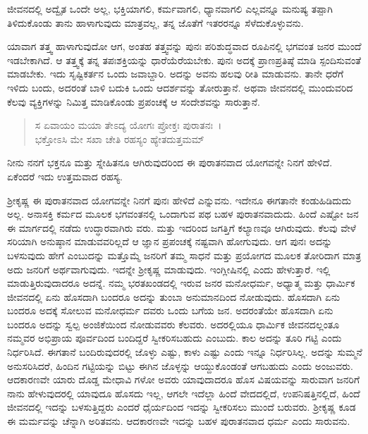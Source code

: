 ಜೀವನದಲ್ಲಿ ಅದ್ವೈತ ಒಂದೇ ಅಲ್ಲ, ಭಕ್ತಿಯಾಗಲಿ, ಕರ್ಮವಾಗಲಿ, ಧ್ಯಾನವಾಗಲಿ ಎಲ್ಲವನ್ನೂ ಮನುಷ್ಯ ತಪ್ಪಾಗಿ ತಿಳಿದುಕೊಂಡು ತಾನು ಹಾಳಾಗುವುದು ಮಾತ್ರವಲ್ಲ, ತನ್ನ ಜೊತೆಗೆ ಇತರರನ್ನೂ ಸೆಳೆದುಕೊಳ್ಳುವನು.

ಯಾವಾಗ ತತ್ತ್ವ ಹಾಳಾಗುವುದೋ ಆಗ, ಅಂತಹ ತತ್ತ್ವವನ್ನು ಪುನಃ ಪರಿಶುದ್ಧವಾದ ರೂಪಿನಲ್ಲಿ ಭಗವಂತ ಜನರ ಮುಂದೆ ಇಡಬೇಕಾಗಿದೆ. ಆ ತತ್ತ್ವಕ್ಕೆ ತನ್ನ ತಪಃಶಕ್ತಿಯನ್ನು ಧಾರೆಯೆರೆಯಬೇಕು. ಪುನಃ ಅದಕ್ಕೆ ಪ್ರಾಣಪ್ರತಿಷ್ಠೆ ಮಾಡಿ ಸ್ಪಂದಿಸುವಂತೆ ಮಾಡಬೇಕು. ಇದು ಸೃಷ್ಟಿಕರ್ತನ ಒಂದು ಜವಾಬ್ದಾರಿ. ಅದನ್ನು ಅವನು ಹಲವು ರೀತಿ ಮಾಡುವನು. ತಾನೇ ಧರೆಗೆ ಇಳಿದು ಬಂದು, ಅದರಂತೆ ಬಾಳಿ ಬದುಕಿ ಒಂದು ಆದರ್ಶವನ್ನು ತೋರುತ್ತಾನೆ. ಅಥವಾ ಜೀವನದಲ್ಲಿ ಮುಂದುವರಿದ ಕೆಲವು ವ್ಯಕ್ತಿಗಳನ್ನು ನಿಮಿತ್ತ ಮಾಡಿಕೊಂಡು ಪ್ರಪಂಚಕ್ಕೆ ಆ ಸಂದೇಶವನ್ನು ಸಾರುತ್ತಾನೆ.

\begin{verse}
ಸ ಏವಾಯಂ ಮಯಾ ತೇಽದ್ಯ ಯೋಗಃ ಪ್ರೋಕ್ತಃ ಪುರಾತನಃ~।\\ಭಕ್ತೋಽಸಿ ಮೇ ಸಖಾ ಚೇತಿ ರಹಸ್ಯಂ ಹ್ಯೇತದುತ್ತಮಮ್ 
\end{verse}

{\small ನೀನು ನನಗೆ ಭಕ್ತನೂ ಮತ್ತು ಸ್ನೇಹಿತನೂ ಆಗಿರುವುದರಿಂದ ಈ ಪುರಾತನವಾದ ಯೋಗವನ್ನೇ ನಿನಗೆ ಹೇಳಿದೆ. ಏಕೆಂದರೆ ಇದು ಉತ್ತಮವಾದ ರಹಸ್ಯ.}

ಶ‍್ರೀಕೃಷ್ಣ ಈ ಪುರಾತನವಾದ ಯೋಗವನ್ನೇ ನಿನಗೆ ಪುನಃ ಹೇಳಿದೆ ಎನ್ನುವನು. ಇದೇನೂ ಈಗತಾನೇ ಕಂಡುಹಿಡಿದುದು ಅಲ್ಲ. ಅನಾಸಕ್ತಿ ಕರ್ಮದ ಮೂಲಕ ಭಗವಂತನಲ್ಲಿ ಒಂದಾಗುವ ಪಥ ಬಹಳ ಪುರಾತನವಾದುದು. ಹಿಂದೆ ಎಷ್ಟೋ ಜನ ಈ ಮಾರ್ಗದಲ್ಲಿ ನಡೆದು ಉದ್ಧಾರವಾಗಿರು ವರು. ಮತ್ತು ಇದರಿಂದ ಜಗತ್ತಿಗೆ ಕಲ್ಯಾಣವೂ ಆಗಿರುವುದು. ಕೆಲವು ವೇಳೆ ಸರಿಯಾಗಿ ಅನುಷ್ಠಾನ ಮಾಡುವವರಿಲ್ಲದೆ ಆ ಜ್ಞಾನ ಪ್ರಪಂಚಕ್ಕೆ ನಷ್ಟವಾಗಿ ಹೋಗುವುದು. ಆಗ ಪುನಃ ಅದನ್ನು ಬಳಸುವುದು ಹೇಗೆ ಎಂಬುದನ್ನು ಮತ್ತೊಮ್ಮೆ ಜನರಿಗೆ ತಮ್ಮ ಸಾಧನೆ ಮತ್ತು ಪ್ರಯೋಗದ ಮೂಲಕ ತೋರಿದಾಗ ಮಾತ್ರ ಅದು ಜನರಿಗೆ ಅರ್ಥವಾಗುವುದು. ಇದನ್ನೇ ಶ‍್ರೀಕೃಷ್ಣ ಮಾಡುವುದು. ಇಂಗ್ಲೀಷಿನಲ್ಲಿ  ಎಂದು ಹೇಳುತ್ತಾರೆ. ಇಲ್ಲಿ ಮಾಡುತ್ತಿರುವುದಾದರೂ ಅದನ್ನೆ. ನಮ್ಮ ಭರತಖಂಡದಲ್ಲಿ ಇರುವ ಜನರ ಮನೋಧರ್ಮ, ಅಧ್ಯಾತ್ಮ ಮತ್ತು ಧಾರ್ಮಿಕ ಜೀವನದಲ್ಲಿ ಏನು ಹೊಸದಾಗಿ ಬಂದರೂ ಅದನ್ನು ತುಂಬಾ ಅನುಮಾನದಿಂದ ನೋಡುವುದು. ಹೊಸದಾಗಿ ಏನು ಬಂದರೂ ಅದಕ್ಕೆ ಸೋಲುವ ಮನೋಧರ್ಮ ದವರು ಒಂದು ಬಗೆಯ ಜನ. ಅದರಂತೆಯೇ ಹೊಸದಾಗಿ ಏನು ಬಂದರೂ ಅದನ್ನು ಸ್ವಲ್ಪ ಅಂಜಿಕೆಯಿಂದ ನೋಡುವವರು ಕೆಲವರು. ಅದರಲ್ಲಿಯೂ ಧಾರ್ಮಿಕ ಜೀವನದಲ್ಲಂತೂ ನಮ್ಮವರ ಅಭಿಪ್ರಾಯ ಪೂರ್ವದಿಂದ ಬಂದಿದ್ದರೆ ಸ್ವೀಕರಿಸಬಹುದು ಎಂಬುದು. ಕಾಲ ಅದನ್ನು ತೂರಿ ಗಟ್ಟಿ ಎಂದು ನಿರ್ಧರಿಸಿದೆ. ಈಗತಾನೆ ಬಂದಿರುವುದರಲ್ಲಿ ಜೊಳ್ಳು ಎಷ್ಟು, ಕಾಳು ಎಷ್ಟು ಎಂದು ಇನ್ನೂ ನಿರ್ಧರಿಸಿಲ್ಲ. ಅದನ್ನು ಸುಮ್ಮನೆ ಅನುಸರಿಸಿದರೆ, ಹಿಂದಿನ ಗಟ್ಟಿಯನ್ನು ಬಿಟ್ಟು ಈಗಿನ ಜೊಳ್ಳನ್ನು ಆಯ್ದುಕೊಂಡಂತೆ ಆಗಬಹುದು ಎಂದು ಅಂಜುವರು. ಆದಕಾರಣವೇ ಯಾರು ದೊಡ್ಡ ಮೇಧಾವಿ ಗಳೋ ಅವರು ಯಾವುದಾದರೂ ಹೊಸ ವಿಷಯವನ್ನು ಸಾರುವಾಗ ಜನರಿಗೆ ನಾನು ಹೇಳುವುದರಲ್ಲಿ ಯಾವುದೂ ಹೊಸದು ಇಲ್ಲ, ಆಗಲೇ ಇದೆಲ್ಲಾ ಹಿಂದೆ ವೇದದಲ್ಲಿದೆ, ಉಪನಿಷತ್ತಿನಲ್ಲಿದೆ, ಹಿಂದೆ ಜೀವನದಲ್ಲಿ ಇದನ್ನು ಬಳಸುತ್ತಿದ್ದರು ಎಂದರೆ ಧೈರ್ಯದಿಂದ ಇದನ್ನು ಸ್ವೀಕರಿಸಲು ಮುಂದೆ ಬರುವರು. ಶ‍್ರೀಕೃಷ್ಣ ಕೂಡ ಈ ಮರ್ಮವನ್ನು ಚೆನ್ನಾಗಿ ಅರಿತವನು. ಆದಕಾರಣವೇ ಇದನ್ನು ಬಹಳ ಪುರಾತನವಾದ ಧರ್ಮ ಎಂದು ಸಾರುವನು.

